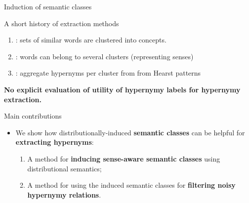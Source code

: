 \documentclass[usenames,dvipsnames]{beamer}
\begin{document}
\begin{frame}{Induction of semantic classes}

\begin{block}{A short history of extraction methods}

\begin{enumerate}
	\item  \cite{Lin2001}: sets of similar words are clustered into concepts.
	\item \cite{Pantel2002}: words can belong to several clusters (representing senses)
	\item \cite{Pantel2004}: aggregate hypernyms per cluster from from Hearst patterns
 

\end{enumerate}
\end{block}

\pause 

\textbf{No explicit evaluation of \alert{utility} of hypernymy labels for \alert{hypernymy extraction}.}

\end{frame}

\begin{frame}{Main contributions}


\begin{itemize}
	\item We show how distributionally-induced \alert{\textbf{semantic classes}} can be helpful  for \alert{\textbf{extracting hypernyms}}:
	\pause
	\vspace{10pt}
	\begin{enumerate}
		\item A method for \textbf{\alert{inducing sense-aware semantic classes}} using distributional semantics; 
		\vspace{10pt}
		\item A method for using the induced semantic classes for \textbf{\alert{filtering noisy hypernymy relations}}.
	 \end{enumerate}
\end{itemize}
\end{frame}
\end{document}
